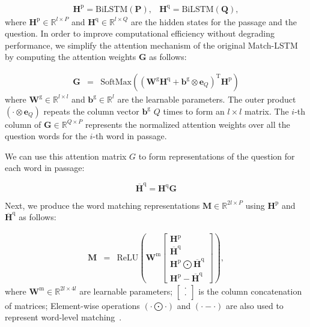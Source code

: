 \documentclass[letterpaper]{article} \usepackage{aaai18}  \usepackage{times}  \usepackage{helvet}  \usepackage{courier}  \usepackage{url}  \usepackage{graphicx}  \usepackage{comment}
\begin{document}
\begin{equation}
\begin{matrix}
\mathbf{H}^{\text{p}} = \text{BiLSTM} (\mathbf{P}), & \mathbf{H}^{\text{q}} =\text{BiLSTM} (\mathbf{Q}),
\end{matrix}
\label{eqn:preprocess}
\end{equation}
where $\mathbf{H}^{\text{p}} \in \mathbb{R}^{l\times P}$ and $ \mathbf{H}^{\text{q}}\in \mathbb{R}^{l\times Q}$ are the hidden states for the passage and the question. 
In order to improve computational efficiency without degrading performance, we simplify the attention mechanism of the original Match-LSTM by computing the attention weights $\mathbf{G}$ as follows:



\begin{eqnarray}
\nonumber
\mathbf{G} & = & \text{SoftMax}\left( (\mathbf{W}^{\text{g}} \mathbf{H}^{\text{q}}+\mathbf{b}^\text{g}\otimes \mathbf{e}_Q)^\text{T} \mathbf{H}^{\text{p}} \right)
\label{eqn:alpha}
\end{eqnarray}
where $\mathbf{W}^{\text{g}}\in \mathbb{R}^{l\times l}$ and $\mathbf{b}^\text{g} \in \mathbb{R}^{l}$ are the learnable parameters. The outer product $(\cdot \otimes \mathbf{e}_Q)$ repeats the column vector $\mathbf{b}^{\text{g}}$ $Q$ times to form an $l \times l$ matrix. The $i$-th column of $\mathbf{G}\in \mathbb{R}^{Q\times P}$ represents the normalized attention weights over all the question words for the $i$-th word in passage.

We can use this attention matrix $G$ to form representations of the question for each word in passage:



\begin{equation}
\overline{\mathbf{H}}^{\text{q}} = \mathbf{H}^{\text{q}}\mathbf{G}
\end{equation}

Next, we produce the word matching representations $\mathbf{M}\in \mathbb{R}^{2l\times P}$ using  $\mathbf{H}^\text{p}$ and $\overline{\mathbf{H}}^\text{q}$ as follows:

\begin{eqnarray}
\mathbf{M} & = & \text{ReLU}\left(  \mathbf{W}^\text{m} \begin{bmatrix}
\mathbf{H}^{\text{p}}
\\ 
\overline{\mathbf{H}}^{\text{q}}
\\ 
 \mathbf{H}^{\text{p}} \bigodot \overline{\mathbf{H}}^{\text{q}}
\\ 
\mathbf{H}^{\text{p}} - \overline{\mathbf{H}}^{\text{q}}
\end{bmatrix} \right),
\label{eqn:match}
\end{eqnarray}
where $\mathbf{W}^\text{m}\in \mathbb{R}^{2l\times 4l}$ are learnable parameters; $\begin{bmatrix}
\cdot \\ \cdot \end{bmatrix}$ is the column concatenation of matrices; Element-wise operations $(\cdot \bigodot \cdot )$ and $(\cdot - \cdot )$ are also used to represent word-level matching~\cite{wang2016compare,Chen:2017:ACL}.
\end{document}
